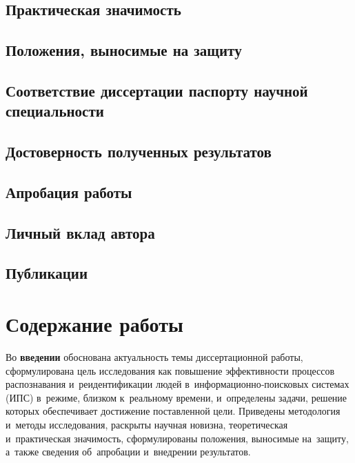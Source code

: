\subsection*{Практическая значимость}
\influenceText

\subsection*{Положения, выносимые на защиту}

\subsection*{Соответствие диссертации паспорту научной специальности}
\conformityText

\subsection*{Достоверность полученных результатов}
\reliabilityText

\subsection*{Апробация работы}
\probationText

\subsection*{Личный вклад автора}
\contributionText

\subsection*{Публикации}
\publicationsText

\section*{Содержание работы}

Во \textbf{введении} обоснована актуальность темы диссертационной работы,
сформулирована цель исследования как повышение эффективности процессов
распознавания и~реидентификации людей в~информационно‑поисковых системах (ИПС)
в~режиме, близком к~реальному времени, и~определены задачи, решение которых
обеспечивает достижение поставленной цели. Приведены методология и~методы
исследования, раскрыты научная новизна, теоретическая и~практическая значимость,
сформулированы положения, выносимые на~защиту, а~также сведения об~апробации
и~внедрении результатов.

